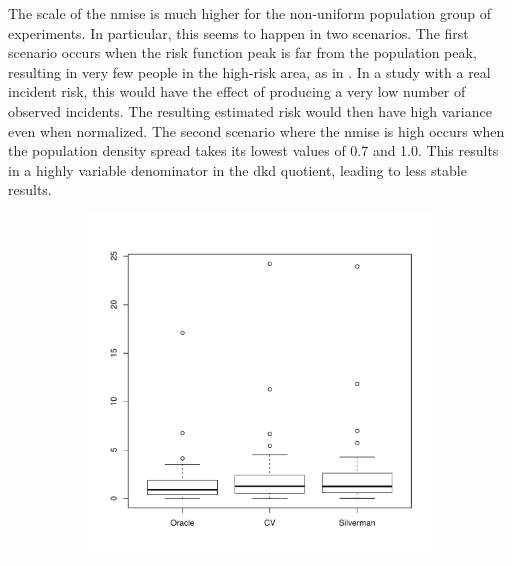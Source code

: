 The scale of the \gls{nmise} is much higher for the non-uniform population group of experiments.
In particular, this seems to happen in two scenarios.
The first scenario occurs when the \gls{risk} function peak is far from the population peak, resulting in very few people in the high-risk area,
as in .
In a study with a real \gls{incident} \gls{risk},
this would have the effect of producing a very low number of observed \glspl{incident}.
The resulting estimated \gls{risk} would then have high variance even when normalized.
The second scenario where the \gls{nmise} is high occurs when the population density \gls{spread} takes its lowest values of 0.7 and 1.0.
This results in a highly variable denominator in the \gls{dkd} quotient,
leading to less stable results.

\begin{figure}[htbp]
    \centering
    \begin{subfigure}[t]{0.45\textwidth}
        \includegraphics[width=\textwidth]{results/by_overall/normalized-mise-boxplot}
        \label{fig:discussion:overall_nmise_boxplot:unif}
    \end{subfigure}
    \begin{subfigure}[t]{0.45\textwidth}

\end{subfigure}
\end{figure}
